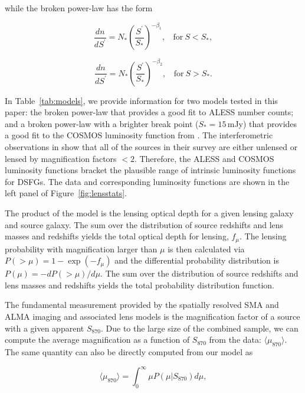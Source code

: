 \documentclass[iop]{emulateapj}
\begin{document}
\noindent while the broken power-law has the form

\begin{equation}
\frac{dn}{dS^\prime} = N_\ast\left(\frac{S^\prime}{S_\ast}\right)^{-\beta_1},~~~~\textrm{for}~S<S_\ast,
\end{equation} 

\begin{displaymath}
\frac{dn}{dS^\prime} = N_\ast\left(\frac{S^\prime}{S_\ast}\right)^{-\beta_2},~~~~\textrm{for}~S>S_\ast.
\end{displaymath}

In Table~\ref{tab:models}, we provide information for two models tested in this
paper: the \citet{Karim:2013lr} broken power-law that provides a good fit to
ALESS number counts; and a broken power-law with a brighter break point
($S_\ast = 15\,$mJy) that provides a good fit to the COSMOS luminosity function
from \citet{Miettinen:2015lr}.  The interferometric observations in
\citet{Miettinen:2015lr} show that all of the sources in their survey are
either unlensed or lensed by magnification factors $<2$.  Therefore, the ALESS
and COSMOS luminosity functions bracket the plausible range of intrinsic
luminosity functions for DSFGs.  The data and corresponding luminosity
functions are shown in the left panel of Figure~\ref{fig:lensstats}.



The product of the model is the lensing optical depth for a given lensing galaxy
and source galaxy. The sum over the distribution of source redshifts and lens
masses and redshifts yields the total optical depth for lensing,  $f_\mu$. The
lensing probability with magnification larger than $\mu$ is then calculated via
$P(>\mu) = 1-\exp(-f_\mu)$ and the differential probability distribution is
$P(\mu) = -dP(>\mu)/d\mu$.  The sum over the distribution of source redshifts
and lens masses and redshifts yields the total probability distribution
function.

The fundamental measurement provided by the spatially resolved SMA and ALMA
imaging and associated lens models is the magnification factor of a source with
a given apparent $S_{870}$.  Due to the large size of the combined sample, we
can compute the average magnification as a function of $S_{870}$ from the data:
$\langle\mu_{870}\rangle$.  The same quantity can also be directly computed from our
model as 

\begin{equation}
    \langle\mu_{870}\rangle = \int_0^\infty \mu P(\mu|S_{870})  d\mu,
 \end{equation}
\end{document}
